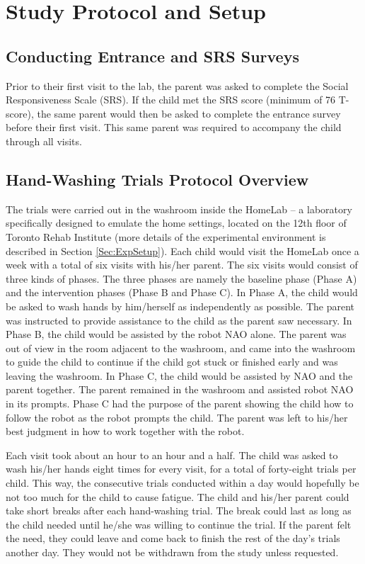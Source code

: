 \section{Study Protocol and Setup}
\label{sec:StudyProtocol}

\subsection{Conducting Entrance and SRS Surveys}
Prior to their first visit to the lab, the parent was asked to complete the Social Responsiveness Scale (SRS). If the child met the SRS score (minimum of 76 T-score), the same parent would then be asked to complete the entrance survey before their first visit. This same parent was required to accompany the child through all visits.


\subsection{Hand-Washing Trials Protocol Overview}
\label{sec:ProtocolOverview}
The trials were carried out in the washroom inside the HomeLab -- a laboratory specifically designed to emulate the home settings, located on the 12th floor of Toronto Rehab Institute (more details of the experimental environment is described in Section \ref{Sec:ExpSetup}).  Each child would visit the HomeLab once a week with a total of six visits with his/her parent. The six visits would consist of three kinds of phases. The three phases are namely the baseline phase (Phase A) and the intervention phases (Phase B and Phase C). In Phase A, the child would be asked to wash hands by him/herself as independently as possible. The parent was instructed to provide assistance to the child as the parent saw necessary.  In Phase B, the child would be assisted by the robot NAO alone.  The parent was out of view in the room adjacent to the washroom, and came into the washroom to guide the child to continue if the child got stuck or finished early and was leaving the washroom.  In Phase C, the child would be assisted by NAO and the parent together.  The parent remained in the washroom and assisted robot NAO in its prompts.  Phase C had the purpose of the parent showing the child how to follow the robot as the robot prompts the child.  The parent was left to his/her best judgment in how to work together with the robot.

Each visit took about an hour to an hour and a half. The child was asked to wash his/her hands eight times for every visit, for a total of forty-eight trials per child.  This way, the consecutive trials conducted within a day would hopefully be not too much for the child to cause fatigue.  The child and his/her parent could take short breaks after each hand-washing trial.  The break could last as long as the child needed until he/she was willing to continue the trial. If the parent felt the need, they could leave and come back to finish the rest of the day's trials another day. They would not be withdrawn from the study unless requested.

